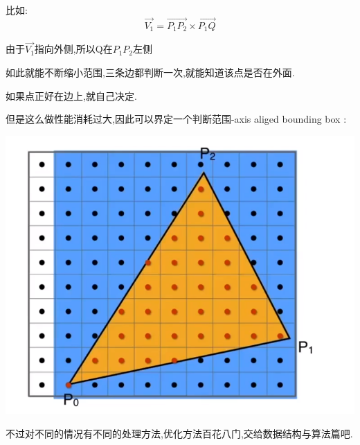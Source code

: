 {{{      比如:
      $$
        \vec{V_1} = \vec{P_1P_2} \times \vec{P_1Q}
      $$

      由于$\vec{V_1}$指向外侧,所以Q在$P_1P_2$左侧

      如此就能不断缩小范围,三条边都判断一次,就能知道该点是否在外面.

      如果点正好在边上,就自己决定.

      但是这么做性能消耗过大,因此可以界定一个判断范围-axis aliged bounding box :

      \begin{center}
        \includegraphics[scale = 0.5]{resources/pixel_boundingBox.png}
      \end{center}

      不过对不同的情况有不同的处理方法,优化方法百花八门,交给数据结构与算法篇吧.
    }%

   }%

 }%